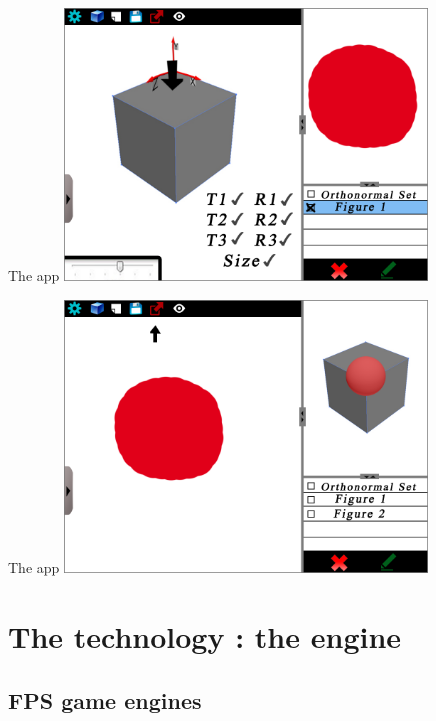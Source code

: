 \documentclass[a4paper,10pt]{beamer}
\begin{document}
			\begin{frame}{The app}
				\includegraphics[height=205pt]{maquette/maquette_7.png}
			\end{frame}
			
			\begin{frame}{The app}
				\includegraphics[height=205pt]{maquette/maquette_8.png}
			\end{frame}
	
	\section{The technology : the engine}
			
		\subsection{FPS game engines}
		
\end{document}
